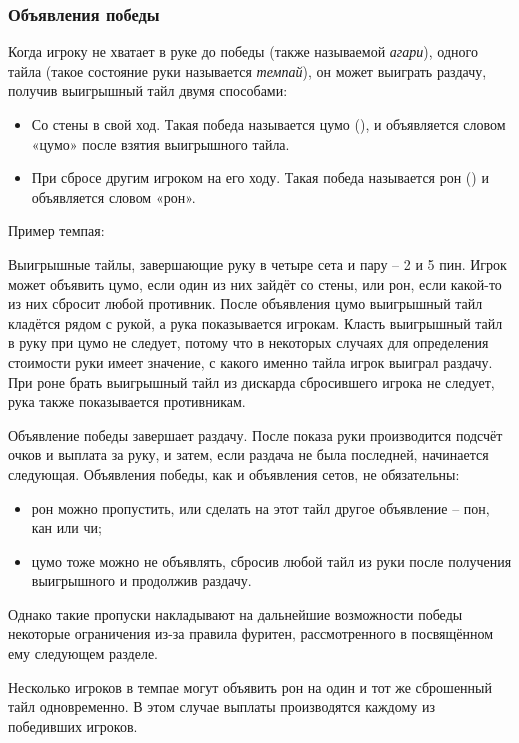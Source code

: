 \subsubsection{Объявления победы}

Когда игроку не хватает в руке до победы (также называемой \textit{агари}), одного тайла (такое состояние руки называется \textit{темпай}), он может выиграть раздачу, получив выигрышный тайл двумя способами:

\begin{itemize}
	\item Со стены в свой ход. Такая победа называется цумо (), и объявляется словом «цумо» после взятия выигрышного тайла.
	\item При сбросе другим игроком на его ходу. Такая победа называется рон () и объявляется словом «рон».
\end{itemize}

Пример темпая:

 \hfill {}

Выигрышные тайлы, завершающие руку в четыре сета и пару – 2 и 5 пин. Игрок может объявить цумо, если один из них зайдёт со стены, или рон, если какой-то из них сбросит любой противник. После объявления цумо выигрышный тайл кладётся рядом с рукой, а рука показывается игрокам. Класть выигрышный тайл в руку при цумо не следует, потому что в некоторых случаях для определения стоимости руки имеет значение, с какого именно тайла игрок выиграл раздачу. При роне брать выигрышный тайл из дискарда сбросившего игрока не следует, рука также показывается противникам.

Объявление победы завершает раздачу. После показа руки производится подсчёт очков и выплата за руку, и затем, если раздача не была последней, начинается следующая. Объявления победы, как и объявления сетов, не обязательны:
\begin{itemize}
	\item рон можно пропустить, или сделать на этот тайл другое объявление – пон, кан или чи;
	\item цумо тоже можно не объявлять, сбросив любой тайл из руки после получения выигрышного и продолжив раздачу.
\end{itemize}
Однако такие пропуски накладывают на дальнейшие возможности победы некоторые ограничения из-за правила фуритен, рассмотренного в посвящённом ему следующем разделе.

Несколько игроков в темпае могут объявить рон на один и тот же сброшенный тайл одновременно. В этом случае выплаты производятся каждому из победивших игроков. 


